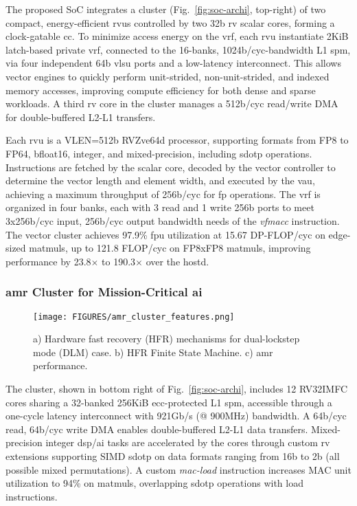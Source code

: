 The proposed SoC integrates a cluster (Fig.~\ref{fig:soc-archi}, top-right) of two compact, energy-efficient \glspl{rvu} controlled by two 32b \gls{rv} scalar cores, forming a clock-gatable \gls{cc}. 
%
To minimize access energy on the \gls{vrf}, each \gls{rvu} instantiate 2KiB latch-based private \gls{vrf}, connected to the 16-banks, 1024b/cyc-bandwidth L1 \gls{spm}, via four independent 64b \gls{vlsu} ports and a low-latency interconnect. This allows vector engines to quickly perform unit-strided, non-unit-strided, and indexed memory accesses, improving compute efficiency for both dense and sparse workloads. A third \gls{rv} core in the cluster manages a 512b/cyc read/write DMA for double-buffered L2-L1 transfers. 

%
Each \gls{rvu} is a VLEN=512b RVZve64d processor, supporting formats from FP8 to FP64, bfloat16, integer, and mixed-precision, including \gls{sdotp} operations. Instructions are fetched by the scalar core, decoded by the vector controller to determine the vector length and element width, and executed by the \gls{vau}, achieving a maximum throughput of 256b/cyc for \gls{fp} operations. The \gls{vrf} is organized in four banks, each with 3 read and 1 write 256b ports to meet 3x256b/cyc input, 256b/cyc output bandwidth needs of the \emph{vfmacc} instruction. 
%
The vector cluster achieves 97.9\% \gls{fpu} utilization at 15.67 DP-FLOP/cyc on edge-sized \glspl{matmul}, up to 121.8 FLOP/cyc on FP8xFP8 \glspl{matmul}, improving performance by 23.8$\times$ to 190.3$\times$ over the \gls{hostd}.

\subsubsection{\gls{amr} Cluster for Mission-Critical \gls{ai}}
\label{sec:int_cluster}
\begin{figure}[t]
    \centering
    \texttt{[image: FIGURES/amr\_cluster\_features.png]}
    \caption{a) Hardware fast recovery (HFR) mechanisms for dual-lockstep mode (DLM) case. b) HFR Finite State Machine. c) \gls{amr} performance.}
    \label{fig:fast-recovery-cluster}
\end{figure}

The  cluster, shown in bottom right of Fig.~\ref{fig:soc-archi}, includes 12 RV32IMFC cores sharing a 32-banked 256KiB \gls{ecc}-protected L1 \gls{spm}, accessible through a one-cycle latency interconnect with 921Gb/s (@ 900MHz) bandwidth. A 64b/cyc read, 64b/cyc write DMA enables double-buffered L2-L1 data transfers. Mixed-precision integer \gls{dsp}/\gls{ai} tasks are accelerated by the cores through custom \gls{rv} extensions supporting SIMD \gls{sdotp} on data formats ranging from 16b to 2b (all possible mixed permutations). A custom \emph{mac-load} instruction increases MAC unit utilization to 94\% on \glspl{matmul}, overlapping \gls{sdotp} operations with load instructions. 

